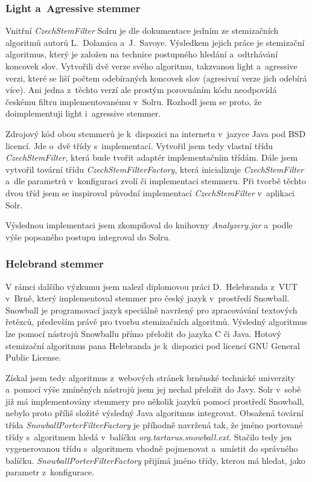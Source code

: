 \subsubsection{Light a~Agressive stemmer}
Vnitřní \emph{CzechStemFilter} Solru je dle dokumentace\cite{sorl:doc} jedním ze stemizačních algoritmů autorů L.~Dolamica a~J.~Savoye. Výsledkem jejich práce\cite{Dolamic:2009:Stemming} je stemizační algoritmus, který je založen na technice postupného hledání a~odtrhávání koncovek slov. Vytvořili dvě verze svého algoritmu, takzvanou light a~agressive verzi, které se liší počtem odebíraných koncovek slov (agresivní verze jich odebírá více). Ani jedna z~těchto verzí ale prostým porovnáním kódu neodpovídá českému filtru implementovanému v~Solru. Rozhodl jsem se proto, že doimplementuji light i~agressive stemmer.

Zdrojový kód obou stemmerů je k~dispozici na internetu v~jazyce Java pod BSD licencí. Jde o~dvě třídy s~implementací. Vytvořil jsem tedy vlastní třídu \emph{CzechStemFilter}, která bude tvořit adaptér implementačním třídám. Dále jsem vytvořil tovární třídu \emph{CzechStemFilterFactory}, která inicializuje \emph{CzechStemFilter} a~dle parametrů v~konfiguraci zvolí  či  implementaci stemmeru. Při tvorbě těchto dvou tříd jsem se inspiroval původní implementací \emph{CzechStemFilter} v~aplikaci Solr.

Výslednou implementaci jsem zkompiloval do knihovny \emph{Analyzery.jar} a~podle výše popsaného postupu integroval do Solru.

\subsubsection{Helebrand stemmer}
V rámci dalšího výzkumu jsem nalezl diplomovou práci D.~Helebranda z~VUT v~Brně\cite{Helebrand:2010:Stemming}, který implementoval stemmer pro český jazyk v~prostředí Snowball. Snowball je programovací jazyk speciálně navržený pro zpracovávání textových řetězců, především právě pro tvorbu stemizačních algoritmů. Výsledný algoritmus lze pomocí nástrojů Snowballu přímo přeložit do jazyka C či Java. Hotový stemizační algoritmus pana Helebranda je k~dispozici pod licencí GNU General Public License.

Získal jsem tedy algoritmus z~webových stránek brněnské technické univerzity a~pomocí výše zmíněných nástrojů jsem jej nechal přeložit do Javy. Solr v~sobě již má implementovány stemmery pro několik jazyků pomocí prostředí Snowball, nebylo proto příliš složité výsledný Java algoritmus integrovat. Obsažená tovární třída \emph{SnowballPorterFilterFactory} je příhodně navržená tak, že jméno  portované třídy s~algoritmem hledá v~balíčku \emph{org.tartarus.snowball.ext}. Stačilo tedy jen vygenerovanou třídu s~algoritmem vhodně pojmenovat a~umístit do správného balíčku. \emph{SnowballPorterFilterFactory} přijímá jméno třídy, kterou má hledat, jako parametr z~konfigurace.

